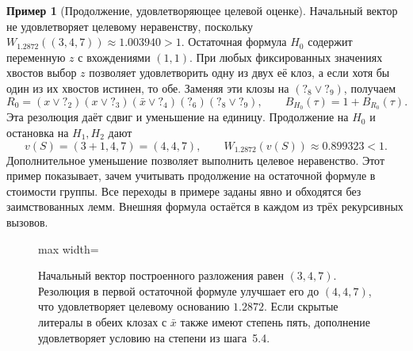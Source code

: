 \documentclass[10pt,twoside]{article}
\newcommand{\tail}[1]{\mathord{?}_{#1}}
\theoremstyle{definition}
\newtheorem{example}{Пример}
\theoremstyle{remark}
\begin{document}
\begin{example}[Продолжение, удовлетворяющее целевой оценке]
Начальный вектор не удовлетворяет целевому неравенству, поскольку
$W_{1.2872}((3,4,7))\approx1.003940>1$.
Остаточная формула $H_0$ содержит переменную $z$ с вхождениями $(1,1)$.
При любых фиксированных значениях хвостов выбор $z$ позволяет
удовлетворить одну из двух её клоз, а если хотя бы один из их хвостов
истинен, то обе. Заменяя эти клозы на $(\tail{8}\vee\tail{9})$, получаем
\[
 R_0=(x\vee\tail{2})(x\vee\tail{3})(\bar x\vee\tail{4})
     (\tail{6})(\tail{8}\vee\tail{9}),
 \qquad B_{H_0}(\tau)=1+B_{R_0}(\tau).
\]
Эта резолюция даёт сдвиг и уменьшение на единицу. Продолжение на $H_0$
и остановка на $H_1,H_2$ дают
\[
 v(S)=(3+1,4,7)=(4,4,7),\qquad
 W_{1.2872}(v(S))\approx0.899323<1.
\]
Дополнительное уменьшение позволяет выполнить целевое неравенство.
Этот пример показывает, зачем учитывать продолжение на остаточной
формуле в стоимости группы. Все переходы в примере заданы явно и
обходятся без заимствованных лемм. Внешняя формула остаётся в каждом
из трёх рекурсивных вызовов.
\end{example}

\begin{figure}[!htbp]
\centering
\begin{adjustbox}{max width=\linewidth}
\end{adjustbox}
\caption{Начальный вектор построенного разложения равен $(3,4,7)$.
Резолюция в первой остаточной формуле улучшает его до $(4,4,7)$, что
удовлетворяет целевому основанию $1.2872$. Если скрытые литералы в обеих клозах с $\bar x$ также имеют степень
пять, дополнение удовлетворяет условию на степени из шага~5.4.}
\label{fig:example}
\end{figure}
\end{document}
